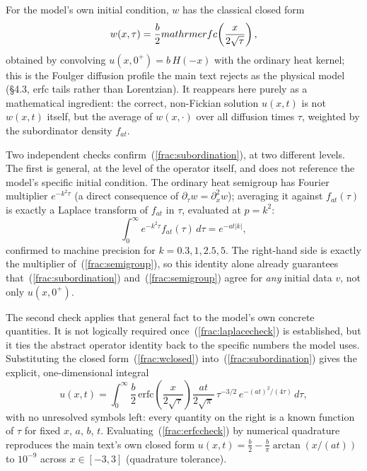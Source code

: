 \documentclass{article}
\begin{document}
For the model's own initial condition, $w$ has the classical closed form
\begin{equation}
w(x,\tau) = \frac{b}{2}\\mathrm{erfc}\!\left(\frac{x}{2\sqrt\tau}\right),
\label{frac:wclosed}
\end{equation}
obtained by convolving $u(x,0^+)=b\,H(-x)$ with the ordinary heat kernel;
this is the Foulger diffusion profile the main text rejects as the
physical model (§4.3, erfc tails rather than Lorentzian). It reappears
here purely as a mathematical ingredient: the correct, non-Fickian solution
$u(x,t)$ is not $w(x,t)$ itself, but the average of $w(x,\cdot)$ over all
diffusion times $\tau$, weighted by the subordinator density $f_{at}$.

Two independent checks confirm~(\ref{frac:subordination}), at two different
levels. The first is general, at the level of the operator itself, and
does not reference the model's specific initial condition. The ordinary
heat semigroup has Fourier multiplier $e^{-k^2\tau}$ (a direct consequence
of $\partial_\tau w=\partial_x^2w$); averaging it against $f_{at}(\tau)$ is
exactly a Laplace transform of $f_{at}$ in $\tau$, evaluated at $p=k^2$:
\begin{equation}
\int_0^\infty e^{-k^2\tau}f_{at}(\tau)\,d\tau = e^{-at|k|},
\label{frac:laplacecheck}
\end{equation}
confirmed to machine precision for $k=0.3,1,2.5,5$. The right-hand side is
exactly the multiplier of~(\ref{frac:semigroup}), so this identity alone
already guarantees that~(\ref{frac:subordination})
and~(\ref{frac:semigroup}) agree for \emph{any} initial data $v$, not only
$u(x,0^+)$.

The second check applies that general fact to the model's own concrete
quantities. It is not logically required once~(\ref{frac:laplacecheck})
is established, but it ties the abstract operator identity back to the
specific numbers the model uses. Substituting the closed
form~(\ref{frac:wclosed}) into~(\ref{frac:subordination}) gives the
explicit, one-dimensional integral
\begin{equation}
u(x,t) = \int_0^\infty \frac{b}{2}\,
  \mathrm{erfc}\!\left(\frac{x}{2\sqrt\tau}\right)
  \frac{at}{2\sqrt\pi}\,\tau^{-3/2}\,e^{-(at)^2/(4\tau)}\,d\tau,
\label{frac:erfccheck}
\end{equation}
with no unresolved symbols left: every quantity on the right is a known
function of $\tau$ for fixed $x$, $a$, $b$, $t$. Evaluating~(\ref{frac:erfccheck})
by numerical quadrature reproduces the main text's own closed form
$u(x,t)=\tfrac{b}{2}-\tfrac{b}{\pi}\arctan(x/(at))$ to $10^{-9}$ across
$x\in[-3,3]$ (quadrature tolerance).
\end{document}
